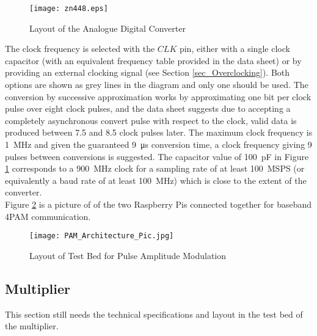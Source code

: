 \documentclass[../main.tex]{subfiles}
\begin{document}
\begin{figure}[ht]
	\centering
	\texttt{[image: zn448.eps]}
	\caption{Layout of the Analogue Digital Converter}
	\label{fig_ADC Layout}
\end{figure}

The clock frequency is selected with the $CLK$ pin, either with a single clock capacitor (with an equivalent frequency table provided in the data sheet) or by providing an external clocking signal (see Section \ref{sec_Overclocking}).
Both options are shown as grey lines in the diagram and only one should be used.
The conversion by successive approximation works by approximating one bit per clock pulse over eight clock pulses, and the data sheet suggests due to accepting a completely asynchronous convert pulse with respect to the clock, valid data is produced between 7.5 and 8.5 clock pulses later.
The maximum clock frequency is \SI{1}{\mega\hertz} and given the guaranteed \SI{9}{\micro\second} conversion time, a clock frequency giving 9 pulses between conversions is suggested.
The capacitor value of \SI{100}{\pico\farad} in Figure \ref{fig_ADC Layout} corresponds to a \SI{900}{\mega\hertz} clock for a sampling rate of at least \SI{100}{MSPS} %
(or equivalently a baud rate of at least \SI{100}{\mega\hertz}) which is close to the extent of the converter.\\

Figure \ref{fig_PAM Architecture} is a picture of of the two Raspberry Pis connected together for baseband 4PAM communication.


\begin{figure}[ht]
	\centering
	\texttt{[image: PAM\_Architecture\_Pic.jpg]}
	\caption{Layout of Test Bed for Pulse Amplitude Modulation}
	\label{fig_PAM Architecture}
\end{figure}

\subsection{Multiplier} \label{sec_Multiplier}

This section still needs the technical specifications and layout in the test bed of the multiplier.

\end{document}
